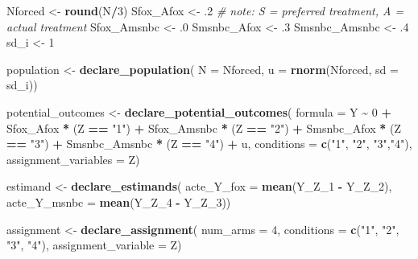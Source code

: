 \documentclass[
]{article}
\newenvironment{Shaded}{\begin{snugshade}}{\end{snugshade}}
\newcommand{\CommentTok}[1]{\textcolor[rgb]{0.56,0.35,0.01}{\textit{#1}}}
\newcommand{\DataTypeTok}[1]{\textcolor[rgb]{0.13,0.29,0.53}{#1}}
\newcommand{\DecValTok}[1]{\textcolor[rgb]{0.00,0.00,0.81}{#1}}
\newcommand{\FloatTok}[1]{\textcolor[rgb]{0.00,0.00,0.81}{#1}}
\newcommand{\KeywordTok}[1]{\textcolor[rgb]{0.13,0.29,0.53}{\textbf{#1}}}
\newcommand{\NormalTok}[1]{#1}
\newcommand{\OperatorTok}[1]{\textcolor[rgb]{0.81,0.36,0.00}{\textbf{#1}}}
\newcommand{\StringTok}[1]{\textcolor[rgb]{0.31,0.60,0.02}{#1}}
\begin{document}
\begin{Shaded}
\begin{Highlighting}[]
\NormalTok{Nforced \textless{}{-}}\StringTok{ }\KeywordTok{round}\NormalTok{(N}\OperatorTok{/}\DecValTok{3}\NormalTok{)}
\NormalTok{Sfox\_Afox \textless{}{-}}\StringTok{ }\FloatTok{.2} \CommentTok{\# note: S = preferred treatment, A = actual treatment}
\NormalTok{Sfox\_Amsnbc \textless{}{-}}\StringTok{ }\FloatTok{.0}
\NormalTok{Smsnbc\_Afox \textless{}{-}}\StringTok{ }\FloatTok{.3}
\NormalTok{Smsnbc\_Amsnbc \textless{}{-}}\StringTok{ }\FloatTok{.4}
\NormalTok{sd\_i \textless{}{-}}\StringTok{ }\DecValTok{1}

\NormalTok{population \textless{}{-}}\StringTok{ }\KeywordTok{declare\_population}\NormalTok{(}
  \DataTypeTok{N =}\NormalTok{ Nforced, }\DataTypeTok{u =} \KeywordTok{rnorm}\NormalTok{(Nforced, }\DataTypeTok{sd =}\NormalTok{ sd\_i))}

\NormalTok{potential\_outcomes \textless{}{-}}\StringTok{ }\KeywordTok{declare\_potential\_outcomes}\NormalTok{(}
  \DataTypeTok{formula =}\NormalTok{ Y }\OperatorTok{\textasciitilde{}}\StringTok{ }\DecValTok{0} \OperatorTok{+}
\StringTok{    }\NormalTok{Sfox\_Afox }\OperatorTok{*}\StringTok{ }\NormalTok{(Z }\OperatorTok{==}\StringTok{ "1"}\NormalTok{) }\OperatorTok{+}
\StringTok{    }\NormalTok{Sfox\_Amsnbc }\OperatorTok{*}\StringTok{ }\NormalTok{(Z }\OperatorTok{==}\StringTok{ "2"}\NormalTok{) }\OperatorTok{+}
\StringTok{    }\NormalTok{Smsnbc\_Afox }\OperatorTok{*}\StringTok{ }\NormalTok{(Z }\OperatorTok{==}\StringTok{ "3"}\NormalTok{) }\OperatorTok{+}
\StringTok{    }\NormalTok{Smsnbc\_Amsnbc }\OperatorTok{*}\StringTok{ }\NormalTok{(Z }\OperatorTok{==}\StringTok{ "4"}\NormalTok{) }\OperatorTok{+}\StringTok{ }\NormalTok{u,}
  \DataTypeTok{conditions =} \KeywordTok{c}\NormalTok{(}\StringTok{"1"}\NormalTok{, }\StringTok{"2"}\NormalTok{, }\StringTok{"3"}\NormalTok{,}\StringTok{"4"}\NormalTok{),}
  \DataTypeTok{assignment\_variables =}\NormalTok{ Z)}

\NormalTok{estimand \textless{}{-}}\StringTok{ }\KeywordTok{declare\_estimands}\NormalTok{(}
  \DataTypeTok{acte\_Y\_fox =} \KeywordTok{mean}\NormalTok{(Y\_Z\_}\DecValTok{1} \OperatorTok{{-}}\StringTok{ }\NormalTok{Y\_Z\_}\DecValTok{2}\NormalTok{),}
  \DataTypeTok{acte\_Y\_msnbc =} \KeywordTok{mean}\NormalTok{(Y\_Z\_}\DecValTok{4} \OperatorTok{{-}}\StringTok{ }\NormalTok{Y\_Z\_}\DecValTok{3}\NormalTok{))}

\NormalTok{assignment \textless{}{-}}\StringTok{ }\KeywordTok{declare\_assignment}\NormalTok{(}
  \DataTypeTok{num\_arms =} \DecValTok{4}\NormalTok{,}
  \DataTypeTok{conditions =} \KeywordTok{c}\NormalTok{(}\StringTok{"1"}\NormalTok{, }\StringTok{"2"}\NormalTok{, }\StringTok{"3"}\NormalTok{, }\StringTok{"4"}\NormalTok{),}
  \DataTypeTok{assignment\_variable =}\NormalTok{ Z)}


\end{Highlighting}
\end{Shaded}
\end{document}
